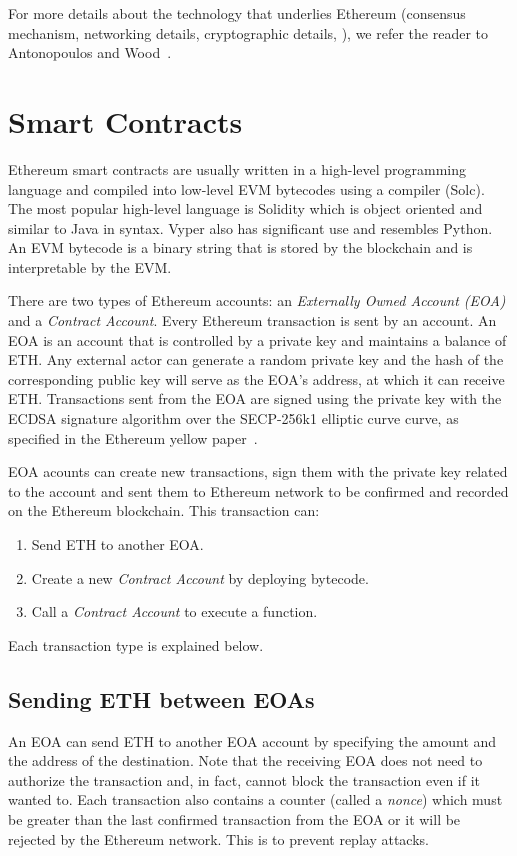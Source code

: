 For more details about the technology that underlies Ethereum (\eg consensus mechanism, networking details, cryptographic details, \etc), we refer the reader to Antonopoulos and Wood~\cite{antonopoulos2018mastering}.

\section{Smart Contracts}

Ethereum smart contracts are usually written in a high-level programming language and compiled into low-level EVM bytecodes using a compiler (\eg Solc). The most popular high-level language is Solidity which is object oriented and similar to Java in syntax.  Vyper also has significant use and resembles Python. An EVM bytecode is a binary string that is stored by the blockchain and is interpretable by the EVM.

There are two types of Ethereum accounts: an \textit{Externally Owned Account (EOA)} and a \textit{Contract Account}. Every Ethereum transaction is sent by an account. 
An EOA is an account that is controlled by a private key and maintains a balance of ETH. Any external actor can generate a random private key and the hash of the corresponding public key will serve as the EOA's address, at which it can receive ETH. Transactions sent from the EOA are signed using the private key with the ECDSA signature algorithm over the SECP-256k1 elliptic curve curve, as specified in the Ethereum yellow paper~\cite{wood2014ethereum}.

EOA acounts can create new transactions, sign them with the private key related to the account and sent them to Ethereum network to be confirmed and recorded on the Ethereum blockchain. This transaction can:
\begin{enumerate}
    \item Send ETH to another EOA.
    \item Create a new \textit{Contract Account} by deploying bytecode.
    \item Call a \textit{Contract Account} to execute a function.
\end{enumerate}

Each transaction type is explained below.

\subsection{Sending ETH between EOAs} 
An EOA can send ETH to another EOA account by specifying the amount and the address of the destination. Note that the receiving EOA does not need to authorize the transaction and, in fact, cannot block the transaction even if it wanted to. Each transaction also contains a counter (called a \textit{nonce}) which must be greater than the last confirmed transaction from the EOA or it will be rejected by the Ethereum network. This is to prevent replay attacks. 

